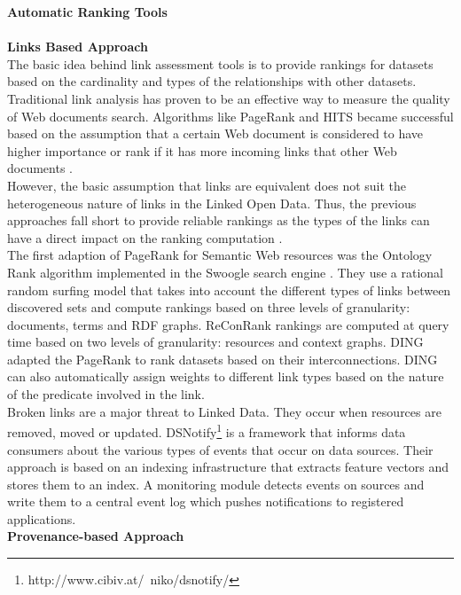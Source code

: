\documentclass[onecolumn, crcready]{iosart2c}
\begin{document}
\noindent
{\bf Automatic Ranking Tools}\\ \\
{\bf Links Based Approach}\\

The basic idea behind link assessment tools is to provide rankings for datasets based on the cardinality and types of the relationships with other datasets. Traditional link analysis has proven to be an effective way to measure the quality of Web documents search. Algorithms like PageRank \cite{Lawrence981} and HITS \cite{Kleinberg:1999} became successful based on the assumption that a certain Web document is considered to have higher importance or rank if it has more incoming links that other Web documents \cite{Brin:1998}\cite{Chakrabarti99miningthe}.\\ However, the basic assumption that links are equivalent does not suit the heterogeneous nature of links in the Linked Open Data. Thus, the previous approaches fall short to provide reliable rankings as the types of the links can have a direct impact on the ranking computation \cite{Toupikov2009}.\\ The first adaption of PageRank for Semantic Web resources was the Ontology Rank algorithm implemented in the Swoogle search engine \cite{Ding2004}. They use a rational random surfing model that takes into account the different types of links between discovered sets and compute rankings based on three levels of granularity: documents, terms and RDF graphs. ReConRank \cite{Hogan06reconrank:a} rankings are computed at query time based on two levels of granularity: resources and context graphs. DING \cite{Toupikov2009} adapted the PageRank to rank datasets based on their interconnections. DING can also automatically assign weights to different link types based on the nature of the predicate involved in the link.\\Broken links are a major threat to Linked Data. They occur when resources are removed, moved or updated. DSNotify\footnote{http://www.cibiv.at/~niko/dsnotify/}\cite{cs142} is a framework that informs data consumers about the various types of events that occur on data sources. Their approach is based on an indexing infrastructure that extracts feature vectors and stores them to an index. A monitoring module detects events on sources and write them to a central event log which pushes notifications to registered applications.\\

{\bf Provenance-based Approach}\\
\end{document}
